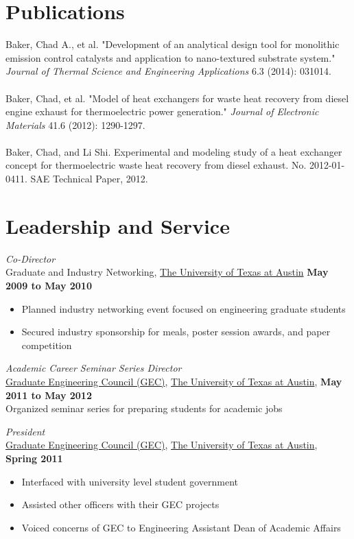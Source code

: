 \documentclass[centered]{res}
\begin{document}
\begin{resume}
\section{Publications}

Baker, Chad A., et al. "Development of an analytical design tool for
monolithic emission control catalysts and application to nano-textured
substrate system." \textit{Journal of Thermal Science and Engineering
  Applications} 6.3 (2014): 031014. \\
\vspace{-5pt} \\
%
Baker, Chad, et al. "Model of heat exchangers for waste heat recovery
from diesel engine exhaust for thermoelectric power generation."
\textit{Journal of Electronic Materials} 41.6 (2012): 1290-1297. \\
\vspace{-5pt} \\
%
Baker, Chad, and Li Shi. Experimental and modeling study of a heat
exchanger concept for thermoelectric waste heat recovery from diesel
exhaust. No. 2012-01-0411. SAE Technical Paper, 2012.

\newpage
\section{Leadership and Service}
\textit{Co-Director} \\
Graduate and Industry Networking,
\href{http://www.utexas.edu}{The University of Texas at Austin}
\hfill \textbf{May 2009 to May 2010}
\begin{itemize} \itemsep -2pt %
\item Planned industry networking event focused on engineering
  graduate students
\item Secured industry sponsorship for meals, poster session awards,
  and paper competition
\end{itemize}

\textit{Academic Career Seminar Series Director} \\
\href{http://sites.google.com/site/utexasgecouncil/}{Graduate Engineering Council (GEC)},
\href{http://www.utexas.edu}{The University of Texas at Austin},
\hfill \textbf{May 2011 to May 2012} \\ 
Organized seminar series for preparing students for academic jobs

\textit{President} \\
\href{http://sites.google.com/site/utexasgecouncil/}{Graduate Engineering Council (GEC)},
\href{http://www.utexas.edu}{The University of Texas at Austin},
\hfill \textbf{Spring 2011}
\begin{itemize} \itemsep -2pt %
\item Interfaced with university level student government
\item Assisted other officers with their GEC projects
\item Voiced concerns of GEC to Engineering Assistant Dean of Academic
  Affairs 
\end{itemize}


\end{resume}
\end{document}
